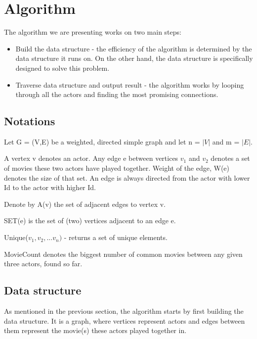 \section{Algorithm}
\label{Algorithm}

The algorithm we are presenting works on two main steps:
\begin{itemize}
  \item Build the data structure - the efficiency of the algorithm is determined by the data structure it runs on. On the other hand, the data structure is specifically designed to solve this problem.
  \item Traverse data structure and output result - the algorithm works by looping through all the actors and finding the most promising connections.
\end{itemize} 

\subsection{Notations}
Let G = (V,E) be a weighted, directed simple graph and let n = \(\lvert V\rvert\) and m = \(\lvert E\rvert\).

A vertex v denotes an actor. Any edge e between vertices \(v_1\) and \(v_2\) denotes a set of movies these two actors have played together. Weight of the edge, W(e) denotes the size of that set. An edge is always directed from the actor with lower Id to the actor with higher Id.

Denote by A(v) the set of adjacent edges to vertex v.

SET(e) is the set of (two) vertices adjacent to an edge e.

Unique(\(v_1, v_2,... v_n)\) - returns a set of unique elements.

MovieCount denotes the biggest number of common movies between any given three actors, found so far.

\subsection{Data structure}
As mentioned in the previous section, the algorithm starts by first building the data structure. It is a graph, where vertices represent actors and edges between them represent the movie(s) these actors played together in. 

